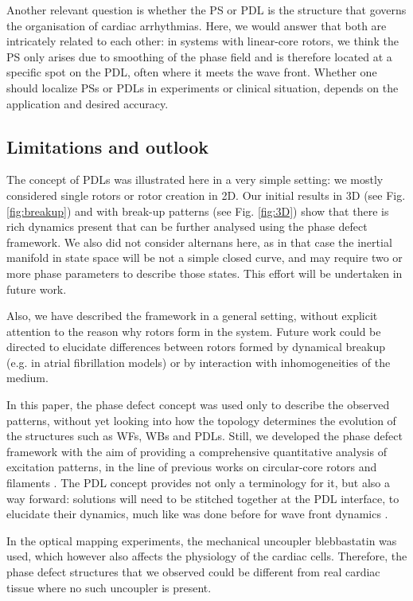 \documentclass[aps,pre,amsfonts,amssymb,amsmath,twocolumn, superscriptaddress]{revtex4-1}
\begin{document}
Another relevant question is whether the PS or PDL is the structure that governs the organisation of cardiac arrhythmias. Here, we would answer that both are intricately related to each other: in systems with linear-core rotors, we think the PS only arises due to smoothing of the phase field and is therefore located at a specific spot on the PDL, often where it meets the wave front. Whether one should localize PSs or PDLs in experiments or clinical situation, depends on the application and desired accuracy.

\subsection{Limitations and outlook}

The concept of PDLs was illustrated here in a very simple setting: we mostly considered single rotors or rotor creation in 2D. Our initial results in 3D (see Fig. \ref{fig:breakup}) and with break-up patterns (see Fig. \ref{fig:3D}) show that there is rich dynamics present that can be further analysed using the phase defect framework. We also did not consider alternans here, as in that case the inertial manifold in state space will be not a simple closed curve, and may require two or more phase parameters to describe those states. This effort will be undertaken in future work. 

Also, we have described the framework in a general setting, without explicit attention to the reason why rotors form in the system. Future work could be directed to elucidate differences between rotors formed by dynamical breakup (e.g. in atrial fibrillation models) or by interaction with inhomogeneities of the medium. 

In this paper, the phase defect concept was used only to describe the observed patterns, without yet looking into how the topology determines the evolution of the structures such as WFs, WBs and PDLs. Still, we developed the phase defect framework with the aim of providing a comprehensive quantitative analysis of excitation patterns, in the line of previous works on circular-core rotors and filaments \citep{Keener:1988,Wellner:2002,Verschelde:2007,Dierckx:2012}. The PDL concept provides not only a terminology for it, but also a way forward: solutions will need to be stitched together at the PDL interface, to elucidate their dynamics, much like was done before for wave front dynamics \citep{Keener:1986}. 

In the optical mapping experiments, the mechanical uncoupler blebbastatin was used, which however also affects the physiology of the cardiac cells. Therefore, the phase defect structures that we observed could be different from real cardiac tissue where no such uncoupler is present. 
\end{document}
